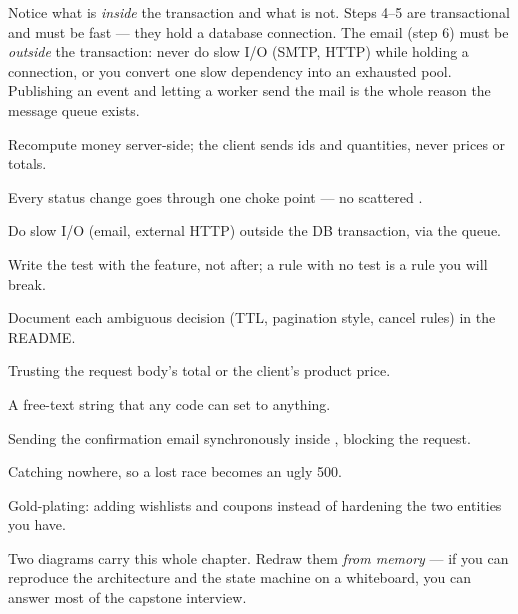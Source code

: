 \begin{perfnote}
Notice what is \emph{inside} the transaction and what is not. Steps 4--5 are transactional and must be fast --- they hold a database connection. The email (step 6) must be \emph{outside} the transaction: never do slow I/O (SMTP, HTTP) while holding a connection, or you convert one slow dependency into an exhausted pool. Publishing an event and letting a worker send the mail is the whole reason the message queue exists.
\end{perfnote}

\begin{bestpractices}
\begin{wbitem}
  \item Recompute money server-side; the client sends ids and quantities, never prices or totals.
  \item Every status change goes through one  choke point --- no scattered .
  \item Do slow I/O (email, external HTTP) outside the DB transaction, via the queue.
  \item Write the test with the feature, not after; a rule with no test is a rule you will break.
  \item Document each ambiguous decision (TTL, pagination style, cancel rules) in the README.
\end{wbitem}
\end{bestpractices}
\begin{mistakes}
\begin{wbitem}
  \item Trusting the request body's total or the client's product price.
  \item A free-text  string that any code can set to anything.
  \item Sending the confirmation email synchronously inside , blocking the request.
  \item Catching  nowhere, so a lost race becomes an ugly 500.
  \item Gold-plating: adding wishlists and coupons instead of hardening the two entities you have.
\end{wbitem}
\end{mistakes}


Two diagrams carry this whole chapter. Redraw them \emph{from memory} --- if you can reproduce the architecture and the state machine on a whiteboard, you can answer most of the capstone interview.

